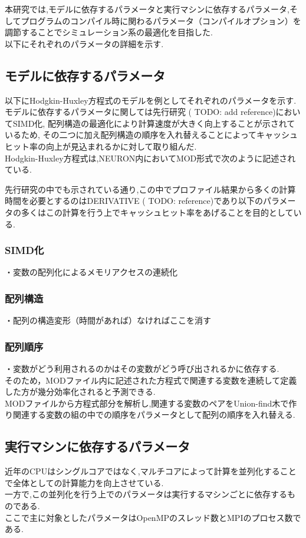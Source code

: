 本研究では,モデルに依存するパラメータと実行マシンに依存するパラメータ,そしてプログラムのコンパイル時に関わるパラメータ（コンパイルオプション）を調節することでシミュレーション系の最適化を目指した.\\
以下にそれぞれのパラメータの詳細を示す.\\
\subsection{モデルに依存するパラメータ}
以下にHodgkin-Huxley方程式のモデルを例としてそれぞれのパラメータを示す.\\
モデルに依存するパラメータに関しては先行研究 ( TODO: add reference)においてSIMD化, 配列構造の最適化により計算速度が大きく向上することが示されているため,
その二つに加え配列構造の順序を入れ替えることによってキャッシュヒット率の向上が見込まれるかに対して取り組んだ.\\
Hodgkin-Huxley方程式は,NEURON内においてMOD形式で次のように記述されている.\\
{\footnotesize

}
先行研究の中でも示されている通り,この中でプロファイル結果から多くの計算時間を必要とするのはDERIVATIVE ( TODO: reference)であり以下のパラメータの多くはこの計算を行う上でキャッシュヒット率をあげることを目的としている.\\
\subsubsection{SIMD化}
・変数の配列化によるメモリアクセスの連続化
\subsubsection{配列構造}
・配列の構造変形（時間があれば）なければここを消す
\subsubsection{配列順序}
・変数がどう利用されるのかはその変数がどう呼び出されるかに依存する.\\
そのため，MODファイル内に記述された方程式で関連する変数を連続して定義した方が幾分効率化されると予測できる.\\
MODファイルから方程式部分を解析し,関連する変数のペアをUnion-find木で作り関連する変数の組の中での順序をパラメータとして配列の順序を入れ替える.\\
\subsection{実行マシンに依存するパラメータ}
近年のCPUはシングルコアではなく,マルチコアによって計算を並列化することで全体としての計算能力を向上させている.\\
一方で,この並列化を行う上でのパラメータは実行するマシンごとに依存するものである.\\
ここで主に対象としたパラメータはOpenMPのスレッド数とMPIのプロセス数である.\\
